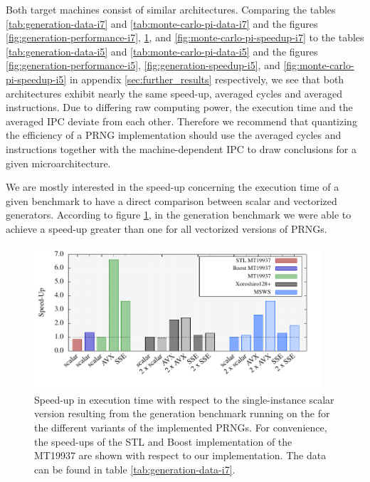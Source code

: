 \documentclass{stdlocal}
\begin{document}
    Both target machines consist of similar architectures.
    Comparing the tables \ref{tab:generation-data-i7} and \ref{tab:monte-carlo-pi-data-i7} and the figures \ref{fig:generation-performance-i7}, \ref{fig:generation-speedup-i7}, and \ref{fig:monte-carlo-pi-speedup-i7} to the tables \ref{tab:generation-data-i5} and \ref{tab:monte-carlo-pi-data-i5} and the figures \ref{fig:generation-performance-i5}, \ref{fig:generation-speedup-i5}, and \ref{fig:monte-carlo-pi-speedup-i5} in appendix \ref{sec:further_results} respectively, we see that both architectures exhibit nearly the same speed-up, averaged cycles and averaged instructions.
    Due to differing raw computing power, the execution time and the averaged IPC deviate from each other.
    Therefore we recommend that quantizing the efficiency of a PRNG implementation should use the averaged cycles and instructions together with the machine-dependent IPC to draw conclusions for a given microarchitecture.

    We are mostly interested in the speed-up concerning the execution time of a given benchmark to have a direct comparison between scalar and vectorized generators.
    According to figure \ref{fig:generation-speedup-i7}, in the generation benchmark we were able to achieve a speed-up greater than one for all vectorized versions of PRNGs.

    \begin{figure}
      \center
      \includegraphics[width=0.95\textwidth]{plots/generation_desktop_speedup.pdf}
      \caption[Generation Benchmark Speed-Up for ]{%
        Speed-up in execution time with respect to the single-instance scalar version resulting from the generation benchmark running on the  for the different variants of the implemented PRNGs.
        For convenience, the speed-ups of the STL and Boost implementation of the MT19937 are shown with respect to our implementation.
        The data can be found in table \ref{tab:generation-data-i7}.
      }
      \label{fig:generation-speedup-i7}
    \end{figure}
\end{document}
